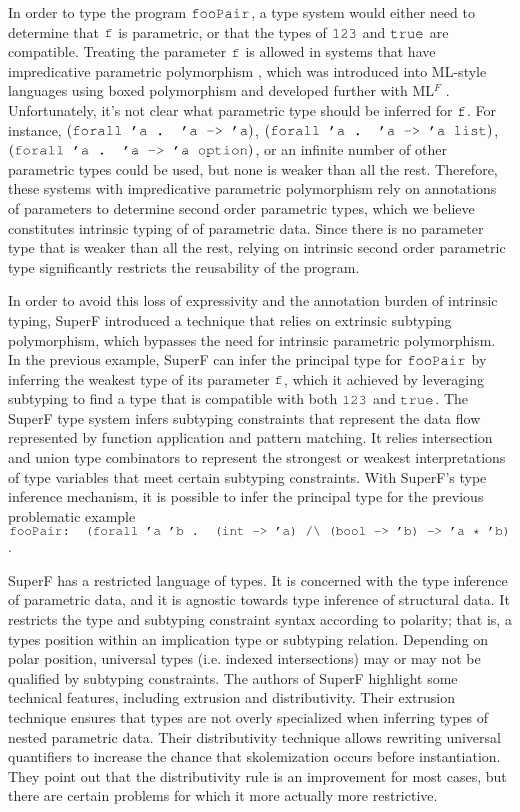 \documentclass[acmsmall]{acmart}
\theoremstyle{definition}
\begin{document}
In order to type the program $\J{fooPair}$, a type system would either need to determine that
$\J{f}$ is parametric, or that the types of $\J{123}$ and $\J{true}$ are compatible.
Treating the parameter $\J{f}$ is allowed in systems that have impredicative parametric polymorphism \cite{}, which
was introduced into ML-style languages using boxed polymorphism \cite{} and developed further with ML$^F$ \cite{}. 
Unfortunately, it's not clear what parametric type should be inferred for $\J{f}$.
For instance, $(\J{forall 'a . 'a -> 'a})$, $(\J{forall 'a . 'a -> 'a list})$, $(\J{forall 'a . 'a -> 'a option})$, 
or an infinite number of
other parametric types could be used, but none is weaker than all the rest.
Therefore, these systems with impredicative parametric polymorphism rely on annotations of parameters to
determine second order parametric types, which we believe constitutes intrinsic typing of
of parametric data. Since there is no parameter type that is weaker than all the rest,
relying on intrinsic second order parametric type significantly restricts the reusability
of the program.

In order to avoid this loss of expressivity and the annotation burden of intrinsic typing, 
SuperF \cite{} introduced 
a technique that relies on extrinsic subtyping polymorphism, 
which bypasses the need for intrinsic parametric polymorphism.
In the previous example, SuperF can infer the principal type for $\J{fooPair}$ by inferring the 
weakest type of its parameter $\J{f}$, which it achieved by leveraging subtyping to find 
a type that is compatible with both $\J{123}$ and $\J{true}$.
The SuperF type system infers subtyping constraints that represent the data flow represented by
function application and pattern matching. It relies 
intersection and union type combinators to represent the strongest or weakest interpretations
of type variables that meet certain subtyping constraints.   
With SuperF's type inference mechanism, it is possible to infer the principal type for the 
previous problematic example $\J{fooPair: (forall 'a 'b . (int -> 'a) /\textbackslash\ (bool -> 'b) -> 'a * 'b)}$.

SuperF has a restricted language of types. It is concerned with the type inference
of parametric data, and it is agnostic towards type inference of structural data. 
It restricts the type and subtyping constraint syntax according to polarity; that is, a
types position within an implication type or subtyping relation. Depending on polar position,
universal types (i.e. indexed intersections) may or may not be qualified by subtyping constraints.
The authors of SuperF highlight some technical features, including extrusion and distributivity.
Their extrusion technique ensures that types are not overly specialized
when inferring types of nested parametric data. Their distributivity technique allows
rewriting universal quantifiers to increase the chance that skolemization occurs before instantiation. 
They point out that the distributivity rule is an improvement for most cases, but there are certain
problems for which it more actually more restrictive.
\end{document}
